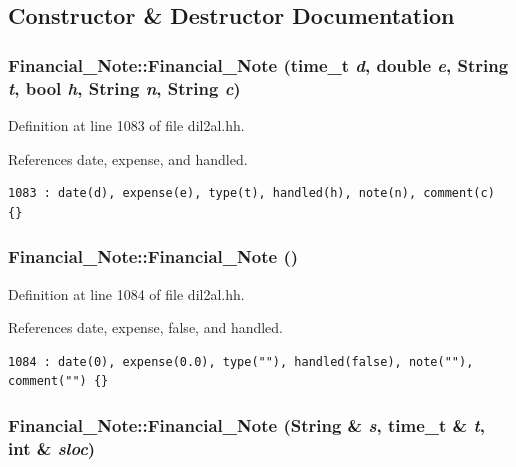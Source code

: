 \subsection{Constructor \& Destructor Documentation}
\subsubsection{\setlength{\rightskip}{0pt plus 5cm}Financial\_\-Note::Financial\_\-Note (time\_\-t {\em d}, double {\em e}, {\bf String} {\em t}, bool {\em h}, {\bf String} {\em n}, {\bf String} {\em c})\hspace{0.3cm}{\tt  [inline]}}\label{classFinancial__Note_a0}




Definition at line 1083 of file dil2al.hh.

References date, expense, and handled.



\footnotesize\begin{verbatim}1083 : date(d), expense(e), type(t), handled(h), note(n), comment(c) {}
\end{verbatim}\normalsize 
{}
\subsubsection{\setlength{\rightskip}{0pt plus 5cm}Financial\_\-Note::Financial\_\-Note ()\hspace{0.3cm}{\tt  [inline]}}\label{classFinancial__Note_a1}




Definition at line 1084 of file dil2al.hh.

References date, expense, false, and handled.



\footnotesize\begin{verbatim}1084 : date(0), expense(0.0), type(""), handled(false), note(""), comment("") {}
\end{verbatim}\normalsize 
{}
\subsubsection{\setlength{\rightskip}{0pt plus 5cm}Financial\_\-Note::Financial\_\-Note ({\bf String} \& {\em s}, time\_\-t \& {\em t}, int \& {\em sloc})\hspace{0.3cm}{\tt  [inline]}}\label{classFinancial__Note_a2}




